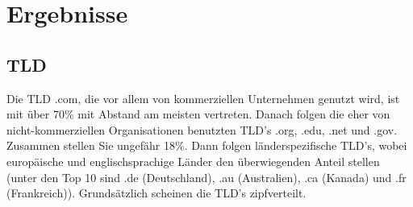 \documentclass[a4paper,12pt,titlepage=false]{scrreprt}
\begin{document}
\chapter{Ergebnisse}


\section{TLD}
\vspace{.1cm}
Die TLD .com, die vor allem von kommerziellen Unternehmen genutzt wird, ist mit über 70\% mit Abstand am meisten vertreten. Danach folgen die eher von nicht-kommerziellen Organisationen benutzten TLD's .org, .edu, .net und .gov. Zusammen stellen Sie ungefähr 18\%. Dann folgen länderspezifische TLD's, wobei europäische und englischsprachige Länder den überwiegenden Anteil stellen (unter den Top 10 sind .de (Deutschland), .au (Australien), .ca (Kanada) und .fr (Frankreich)).
Grundsätzlich scheinen die TLD's zipfverteilt.


\vspace{.1cm}
\end{document}
